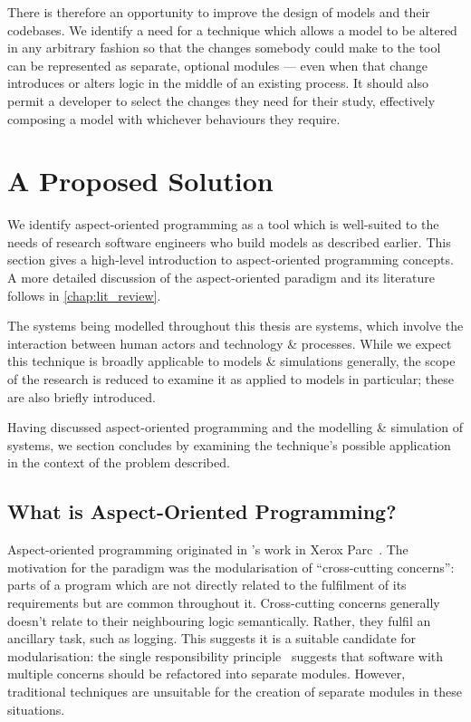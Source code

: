There is therefore an opportunity to improve the design of models and their
codebases. We identify a need for a technique which allows a model to be altered
in any arbitrary fashion so that the changes somebody could make to the tool can
be represented as separate, optional modules --- even when that change
introduces or alters logic in the middle of an existing process. It should also
permit a developer to select the changes they need for their study, effectively
composing a model with whichever behaviours they require.



\section{A Proposed Solution}
We identify aspect-oriented programming as a tool which is well-suited to the
needs of research software engineers who build models as described earlier. This
section gives a high-level introduction to aspect-oriented programming concepts.
A more detailed discussion of the aspect-oriented
paradigm and its literature follows in \cref{chap:lit_review}.

The systems being modelled throughout this thesis are \sociotechnical systems,
which involve the interaction between human actors and technology \& processes.
While we expect this technique is broadly applicable to models \& simulations
generally, the scope of the research is reduced to examine it as applied to
\sociotechnical models in particular; these are also briefly introduced.

Having discussed aspect-oriented programming and the modelling \& simulation of
\sociotechnical systems, we section concludes by examining the technique's
possible application in the context of the problem described.





\subsection{What is Aspect-Oriented Programming?}

Aspect-oriented programming originated in \citeauthor{kiczales1997aspect}'s work
in Xerox Parc~\cite{kiczales1997aspect}. The motivation for the paradigm was the
modularisation of ``cross-cutting concerns'': parts of a program which are not
directly related to the fulfilment of its requirements but are common throughout
it. Cross-cutting concerns generally doesn't relate to their neighbouring logic
semantically. Rather, they fulfil an ancillary task, such as logging. This
suggests it is a suitable candidate for modularisation: the single
responsibility principle~\cite{martin2003singleresponsibility} suggests that
software with multiple concerns should be refactored into separate modules.
However, traditional techniques are unsuitable for the creation of separate
modules in these situations.

